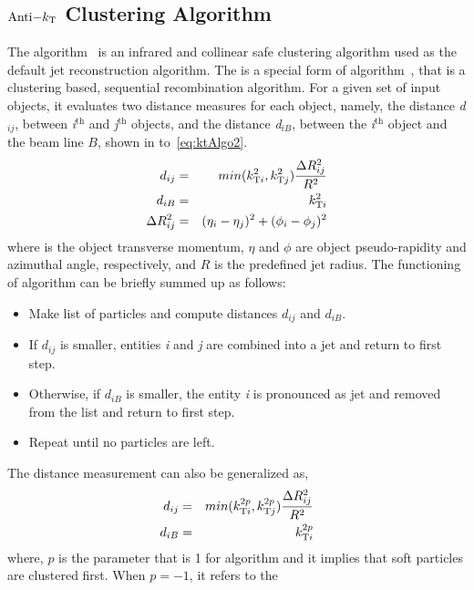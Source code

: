\subsection{\boldmath$\mathrm{Anti-}k_{\mathrm{T}}$ Clustering Algorithm}
The \antikt algorithm~\cite{Cacciari:2008gp} is an infrared and collinear safe clustering algorithm used as the default jet reconstruction algorithm. 
The \antikt is a special form of \kt algorithm~\cite{Catani:1993hr}, that is a clustering based, sequential recombination algorithm.
For a given set of input objects, it evaluates two distance measures for each object, namely, the distance \emph{d}$_{ij}$, between 
\emph{i}$^{\mathrm{th}}$ and \emph{j}$^{\mathrm{th}}$ objects, and the distance \emph{d}$_{iB}$, between the \emph{i}$^{\mathrm{th}}$
object and the beam line $B$, shown in \eqn{\ref{eq:ktAlgo1}} to~\ref{eq:ktAlgo2}.
\begin{eqnarray}
\label{eq:ktAlgo1}
d_{ij} & = & min(k^{2}_{\mathrm{T}i}, k^{2}_{\mathrm{T}j}) \frac{\Delta{R}^{2}_{ij}}{R^{2}} \\
d_{iB} & = & k^{2}_{\mathrm{T}i} \\
\label{eq:ktAlgo2}
\Delta{R}^{2}_{ij} & = & (\eta_{i} - \eta_{j})^{2} + (\phi_{i} - \phi_{j})^{2}
\end{eqnarray}
where \kt is the object transverse momentum, $\eta$ and $\phi$ are object pseudo-rapidity and azimuthal angle, respectively, and $R$ is the
predefined jet radius. The functioning of \kt algorithm can be briefly summed up as follows:
\begin{itemize}
\item Make list of particles and compute distances $d_{ij}$ and $d_{iB}$.
\item If $d_{ij}$ is smaller, entities \emph{i} and \emph{j} are combined into a jet and return to first step.
\item Otherwise, if $d_{iB}$ is smaller, the entity \emph{i} is pronounced as jet and removed from the list and return to first step.
\item Repeat until no particles are left.
\end{itemize}
The distance measurement can also be generalized as,
\begin{eqnarray}
d_{ij} & = & min(k^{2p}_{\mathrm{T}i}, k^{2p}_{\mathrm{T}j}) \frac{\Delta{R}^{2}_{ij}}{R^{2}} \\
d_{iB} & = & k^{2p}_{\mathrm{T}i}
\end{eqnarray}
where, $p$ is the parameter that is 1 for \kt algorithm and it implies that soft particles are clustered first. When $p = -1$, it refers to the \antikt 
